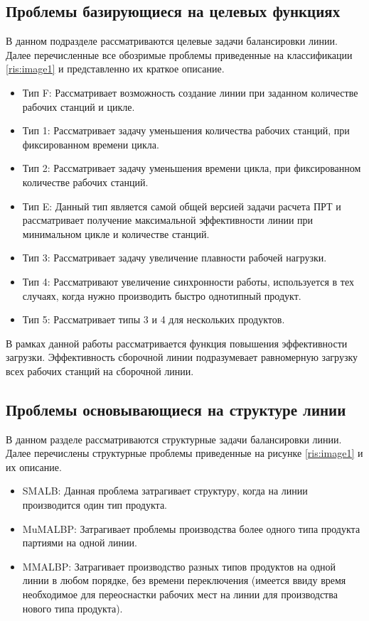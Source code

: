 \subsection{Проблемы базирующиеся на целевых функциях}
В данном подразделе рассматриваются целевые задачи балансировки линии. Далее перечисленные все обозримые проблемы приведенные на классификации \ref{ris:image1} и представленно их краткое описание.
\begin{itemize}
    \item Тип F: Рассматривает возможность создание линии при заданном количестве рабочих станций и цикле.
    \item Тип 1: Рассматривает задачу уменьшения количества рабочих станций, при фиксированном времени цикла.
    \item Тип 2: Рассматривает задачу уменьшения времени цикла, при фиксированном количестве рабочих станций.
    \item Тип E: Данный тип является самой общей версией задачи расчета ПРТ и рассматривает получение максимальной эффективности линии при минимальном цикле и количестве станций.
    \item Тип 3: Рассматривает задачу увеличение плавности рабочей нагрузки.
    \item Тип 4: Рассматривают увеличение синхронности работы, используется в тех случаях, когда нужно производить быстро однотипный продукт.
    \item Тип 5: Рассматривает типы 3 и 4 для нескольких продуктов.
\end{itemize}

В рамках данной работы рассматривается функция повышения эффективности загрузки. Эффективность сборочной линии подразумевает равномерную загрузку всех рабочих станций на сборочной линии. 

\subsection{Проблемы основывающиеся на структуре линии}
В данном разделе рассматриваются структурные задачи балансировки линии. Далее перечислены структурные проблемы приведенные на рисунке \ref{ris:image1} и их описание\cite{Lastra11}.

\begin{itemize}
    \item SMALB: Данная проблема затрагивает структуру, когда на линии производится один тип продукта.
    \item MuMALBP: Затрагивает проблемы производства более одного типа продукта партиями на одной линии.
    \item MMALBP: Затрагивает производство разных типов продуктов на одной линии в любом порядке, без времени переключения (имеется ввиду время необходимое для переоснастки рабочих мест на линии для производства нового типа продукта).
\end{itemize}

